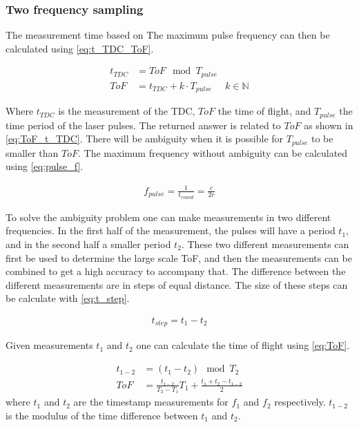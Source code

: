 \subsubsection{Two frequency sampling}

The measurement time based on The maximum pulse frequency can then be calculated using \cref{eq:t_TDC_ToF}.  

\begin{align}\label{eq:t_TDC_ToF}
	t_{TDC} &=ToF \mod T_{pulse}\\	
	ToF &= t_{TDC}+k\cdot T_{pulse} & k \in \mathbb{N}\label{eq:ToF_t_TDC}
\end{align}


Where $t_{TDC}$ is the measurement of the TDC, $ToF$ the time of flight, and $T_{pulse}$ the time period of the laser pulses. The returned answer is related to $ToF$ as shown in \cref{eq:ToF_t_TDC}. There will be ambiguity when it is possible for $T_{pulse}$ to be smaller than $ToF$. The maximum frequency without ambiguity can be calculated using \cref{eq:pulse_f}.

\begin{align}\label{eq:pulse_f}
f_{pulse} = \frac{1}{t_{round}} = \frac{c}{2r}
\end{align}

To solve the ambiguity problem one can make measurements in two different frequencies. In the first half of the measurement, the pulses will have a period $t_1$, and in the second half a smaller period $t_2$. These two different measurements can first be used to determine the large scale ToF, and then the measurements can be combined to get a high accuracy to accompany that. The difference between the different measurements are in steps of equal distance. The size of these steps can be calculate with \cref{eq:t_step}.

\begin{align}\label{eq:t_step}
		t_{step} = t_1 - t_2
\end{align}

Given measurements $t_1$ and $t_2$ one can calculate the time of flight using \cref{eq:ToF}. 

\begin{align}
	t_{1-2} &= (t_1-t_2)\mod T_2\\
	ToF &= \frac{t_{1-2}}{T_2-T_1}T_1+\frac{t_1+t_2-t_{1-2}}{2}\label{eq:ToF}
\end{align}
where $t_1$ and $t_2$ are the timestamp measurements for $f_1$ and $f_2$ respectively. $t_{1-2}$ is the modulus of the time difference between $t_1$ and $t_2$.
